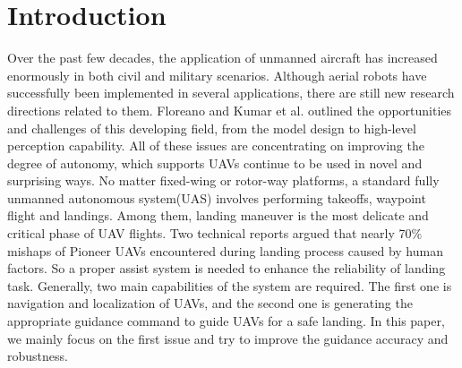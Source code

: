 \documentclass[journal,article,submit,moreauthors,pdftex,10pt,a4paper]{mdpi}
\begin{document}


\section{Introduction}
Over the past few decades, the application of unmanned aircraft has increased enormously in both civil and military scenarios. Although aerial robots have successfully been implemented in several applications, there are still new research directions related to them. Floreano \cite{floreano2015science} and Kumar et al. \cite{kushleyev2013towards} outlined the opportunities and challenges of this developing field, from the model design to high-level perception capability. All of these issues are concentrating on improving the degree of autonomy, which supports UAVs continue to be used in novel and surprising ways.
No matter fixed-wing or rotor-way platforms, a standard fully unmanned autonomous system(UAS) involves performing takeoffs, waypoint flight and landings. Among them, landing maneuver is the most delicate and critical phase of UAV flights. Two technical reports \cite{manning2004role} argued that nearly 70\% mishaps of Pioneer UAVs encountered during landing process caused by human factors. So a proper assist system is needed to enhance the reliability of landing task. Generally, two main capabilities of the system are required. The first one is navigation and localization of UAVs, and the second one is generating the appropriate guidance command to guide UAVs for a safe landing. In this paper, we mainly focus on the first issue and try to improve the guidance accuracy and robustness.
\end{document}
